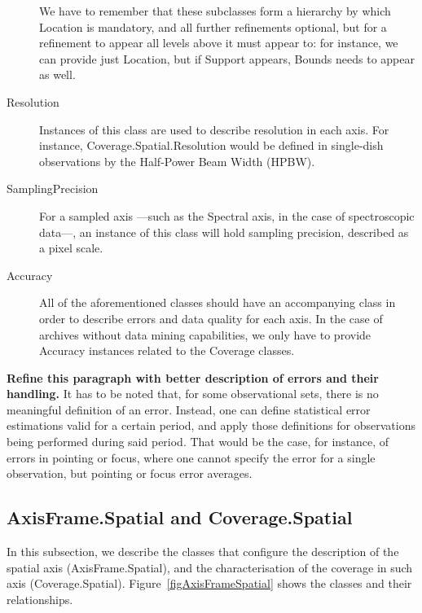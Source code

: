 \begin{description}
			We have to remember that these subclasses form a
			hierarchy by which Location is mandatory, and all
			further refinements optional, but for a refinement
			to appear all levels above it must appear to: for
			instance, we can provide just Location, but if Support
			appears, Bounds needs to appear as well.
		
			\item[Resolution] Instances of this class are used to
			describe resolution in each axis. For instance,
			Coverage.Spatial.Resolution would be defined in 
			single-dish observations by the Half-Power Beam
			Width (HPBW).
			
			 \item[SamplingPrecision] For a sampled axis ---such as
			the Spectral axis, in the case of spectroscopic
			data---, an instance of this class will hold sampling
			precision, described as a pixel scale.
			
			 \item[Accuracy] All of the aforementioned classes
			should have an accompanying class in order to describe
			errors and data quality for each axis. In the case of
			archives without data mining capabilities, we only have
			to provide Accuracy instances related to the Coverage
			classes.
			
		\end{description}
		
		\invisiblenote
		{\textbf{Refine this paragraph with better description of
		errors and their handling.} It has to be noted that, for
		some observational sets, there is no meaningful definition
		of an error. Instead, one can define statistical error
		estimations valid for a certain period, and apply those
		definitions for observations being performed during said
		period. That would be the case, for instance, of errors in
		pointing or focus, where one cannot specify the error for a
		single observation, but pointing or focus error averages.}
		
		\subsection{AxisFrame.Spatial and Coverage.Spatial} %
		\label{ssubSpatialAxis}
			
			In this subsection, we describe the classes that
			configure the description of the spatial axis
			(AxisFrame.Spatial), and the characterisation of the
			coverage in such axis (Coverage.Spatial).
			Figure~\ref{figAxisFrameSpatial} shows the classes and
			their relationships.
			
